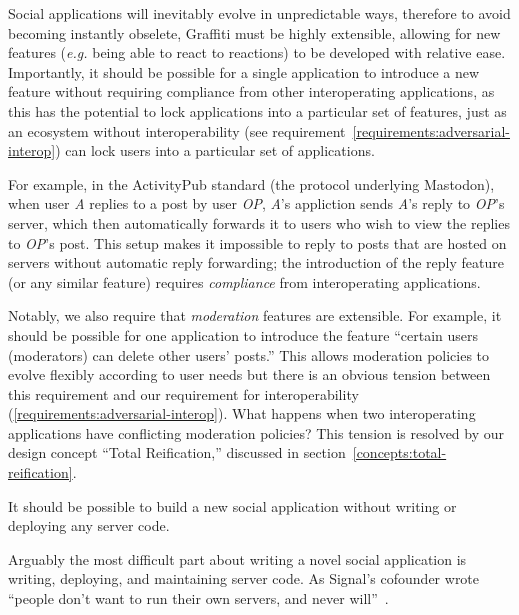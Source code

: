 Social applications will inevitably evolve in unpredictable ways,
therefore to avoid becoming instantly obselete, Graffiti must be highly extensible,
allowing for new features (\emph{e.g.} being able to react to reactions)
to be developed with relative ease.
Importantly, it should be possible for a single application to introduce a new feature
without requiring compliance from other interoperating applications, as this has the potential to
lock applications into a particular set of features,
just as an ecosystem without interoperability (see requirement~\ref{requirements:adversarial-interop}) can lock users into a
particular set of applications.

For example, in the ActivityPub standard (the protocol underlying Mastodon),
when user \emph{A} replies to a post by user \emph{OP}, \emph{A}'s appliction
sends \emph{A}'s reply to \emph{OP}'s server, which then automatically forwards
it to users who wish to view the replies to \emph{OP}'s post.
This setup makes it impossible to reply to posts that are hosted on servers
without automatic reply forwarding;
the introduction of the reply feature (or any similar feature) requires \emph{compliance}
from interoperating applications.

Notably, we also require that \emph{moderation} features are extensible.
For example, it should be possible for one application to introduce the feature
``certain users (moderators) can delete other users' posts.''
This allows moderation policies to evolve flexibly according to user needs
but there is an obvious tension between this requirement
and our requirement for interoperability (\ref{requirements:adversarial-interop}).
What happens when two interoperating applications have conflicting moderation policies?
This tension is resolved by our design concept ``Total Reification,''
discussed in section~\ref{concepts:total-reification}.

\begin{requirement}[Serverless]
    It should be possible to build a new social application without writing or deploying any server code.
\end{requirement}

Arguably the most difficult part about writing a novel
social application is writing, deploying,
and maintaining server code.
As Signal's cofounder wrote
``people don’t want to run their own servers, and never will''~\cite{moxieweb3}.

